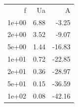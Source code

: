 \begin{tabular}{rrr}
f & Ua & A \\
1e+00 & 6.88 & -3.25 \\
2e+00 & 3.52 & -9.07 \\
5e+00 & 1.44 & -16.83 \\
1e+01 & 0.72 & -22.85 \\
2e+01 & 0.36 & -28.97 \\
5e+01 & 0.15 & -36.59 \\
1e+02 & 0.08 & -42.16 \\
\end{tabular}
